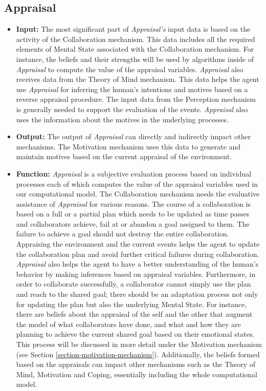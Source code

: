 \documentclass[12pt]{report}
\begin{document}
\subsection{Appraisal}

\begin{itemize}
  \item \textbf{Input:} The most significant part of \textit{Appraisal's} input
  data is based on the activity of the Collaboration mechanism. This data
  includes all the required elements of Mental State associated with the
  Collaboration mechanism. For instance, the beliefs and their strengths will be
  used by algorithms inside of \textit{Appraisal} to compute the value of the
  appraisal variables. \textit{Appraisal} also receives data from the Theory of
  Mind mechanism. This data helps the agent use \textit{Appraisal} for inferring
  the human's intentions and motives based on a reverse appraisal procedure.
  The input data from the Perception mechanism is generally needed to support
  the evaluation of the events. \textit{Appraisal} also uses the information
  about the motives in the underlying processes.
   
  \item \textbf{Output:} The output of \textit{Appraisal} can directly and
  indirectly impact other mechanisms. The Motivation mechanism uses this data to
  generate and maintain motives based on the current appraisal of the
  environment.
  
  \item \textbf{Function:} \textit{Appraisal} is a subjective evaluation process
  based on individual processes each of which computes the value of the
  appraisal variables used in our computational model. The Collaboration
  mechanism needs the evaluative assistance of \textit{Appraisal} for various
  reasons. The course of a collaboration is based on a full or a partial plan
  which needs to be updated as time passes and collaborators achieve, fail at or
  abandon a goal assigned to them. The failure to achieve a goal should not
  destroy the entire collaboration. Appraising the environment and the current
  events helps the agent to update the collaboration plan and avoid further
  critical failures during collaboration.  \textit{Appraisal} also helps the
  agent to have a better understanding of the human's behavior by making
  inferences based on appraisal variables. Furthermore, in order to collaborate
  successfully, a collaborator cannot simply use the plan and reach to the
  shared goal; there should be an adaptation process not only for updating the
  plan but also the underlying Mental State. For instance, there are beliefs
  about the appraisal of the self and the other that augment the model of what
  collaborators have done, and what and how they are planning to achieve the
  current shared goal based on their emotional states. This process will be
  discussed in more detail under the Motivation mechanism (see Section
  \ref{section-motivation-mechanism}). Additionally, the beliefs formed based on
  the appraisals can impact other mechanisms such as the Theory of Mind,
  Motivation and Coping, essentially including the whole computational model.
\end{itemize}
\end{document}
